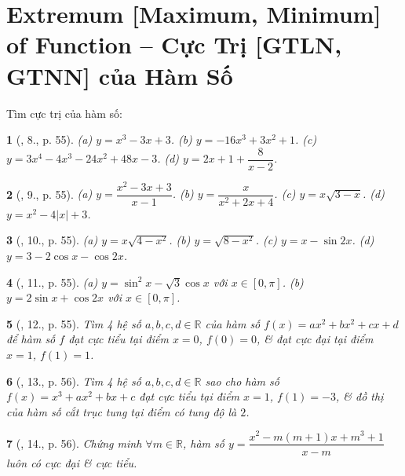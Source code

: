 \documentclass{article}
\newtheorem{baitoan}{}
\begin{document}

\section{Extremum [Maximum, Minimum] of Function -- Cực Trị [GTLN, GTNN] của Hàm Số}
Tìm cực trị của hàm số:

\begin{baitoan}[\cite{TLCT_BT_dai_so_giai_tich_11}, 8., p. 55]
	(a) $y = x^3 - 3x + 3$. (b) $y = -16x^3 + 3x^2 + 1$. (c) $y = 3x^4 - 4x^3 - 24x^2 + 48x - 3$. (d) $y = 2x + 1 + \dfrac{8}{x - 2}$.
\end{baitoan}

\begin{baitoan}[\cite{TLCT_BT_dai_so_giai_tich_11}, 9., p. 55]
	(a) $y = \dfrac{x^2 - 3x + 3}{x - 1}$. (b) $y = \dfrac{x}{x^2 + 2x + 4}$. (c) $y = x\sqrt{3 - x}$. (d) $y = x^2 - 4|x| + 3$.
\end{baitoan}

\begin{baitoan}[\cite{TLCT_BT_dai_so_giai_tich_11}, 10., p. 55]
	(a) $y = x\sqrt{4 - x^2}$. (b) $y = \sqrt{8 - x^2}$. (c) $y = x - \sin2x$. (d) $y = 3 - 2\cos x - \cos2x$.
\end{baitoan}

\begin{baitoan}[\cite{TLCT_BT_dai_so_giai_tich_11}, 11., p. 55]
	(a) $y = \sin^2x - \sqrt{3}\cos x$ với $x\in[0,\pi]$. (b) $y = 2\sin x + \cos2x$ với $x\in[0,\pi]$.
\end{baitoan}

\begin{baitoan}[\cite{TLCT_BT_dai_so_giai_tich_11}, 12., p. 55]
	Tìm 4 hệ số $a,b,c,d\in\mathbb{R}$ của hàm số $f(x) = ax^2 + bx^2 + cx + d$ để hàm số $f$ đạt cực tiểu tại điểm $x = 0$, $f(0) = 0$, \& đạt cực đại tại điểm $x = 1$, $f(1) = 1$.
\end{baitoan}

\begin{baitoan}[\cite{TLCT_BT_dai_so_giai_tich_11}, 13., p. 56]
	Tìm 4 hệ số $a,b,c,d\in\mathbb{R}$ sao cho hàm số $f(x) = x^3 + ax^2 + bx + c$ đạt cực tiểu tại điểm $x = 1$, $f(1) = -3$, \& đồ thị của hàm số cắt trục tung tại điểm có tung độ là $2$.
\end{baitoan}

\begin{baitoan}[\cite{TLCT_BT_dai_so_giai_tich_11}, 14., p. 56]
	Chứng minh $\forall m\in\mathbb{R}$, hàm số $y = \dfrac{x^2 - m(m + 1)x + m^3 + 1}{x - m}$ luôn có cực đại \& cực tiểu.
\end{baitoan}
\end{document}
